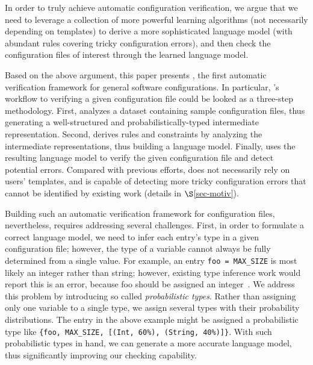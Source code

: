 
In order to truly achieve automatic configuration verification,
we argue that we need to leverage a collection of more powerful learning 
algorithms (not necessarily depending on templates) to derive 
a more sophisticated language model (with abundant rules covering
tricky configuration errors), and then check the configuration files
of interest through the learned language model.

Based on the above argument, 
this paper presents \app, the first automatic verification framework
for general software configurations.
In particular, \app's workflow to verifying a given configuration file
could be looked as a three-step methodology.
First, \app analyzes a dataset containing sample configuration files,
thus generating a well-structured and probabilistically-typed 
intermediate representation.
Second, \app derives rules and constraints by analyzing
the intermediate representations, thus building a language model.
Finally, \app uses the resulting language model
to verify the given configuration file and detect potential errors.
Compared with previous efforts,
\app does not necessarily rely on users' templates, 
and is capable of detecting more tricky configuration errors that
cannot be identified by existing work (details in $\S$\ref{sec-motiv}). 

Building such an automatic verification framework for
configuration files, nevertheless, requires addressing several challenges. 
First, in order to formulate a correct language model, 
we need to infer each entry's type in a given configuration file;
however, the type of a variable cannot always be fully determined 
from a single value. 
For example, an entry {\tt foo = MAX\_SIZE} is most likely
an integer rather than string; however, existing type inference 
work would report this is an error, because foo should be assigned
an integer~\cite{zhang14encore}. We address this problem by introducing 
so called {\emph{probabilistic types}}.
Rather than assigning only one variable to a single type, 
we assign several types with their probability distributions. 
The entry in the above example might be assigned 
a probabilistic type like 
{\tt \{foo, MAX\_SIZE, [(Int, 60\%), (String, 40\%)]\}}.
With such probabilistic types in hand,
we can generate a more accurate language model,
thus significantly improving our checking capability.

